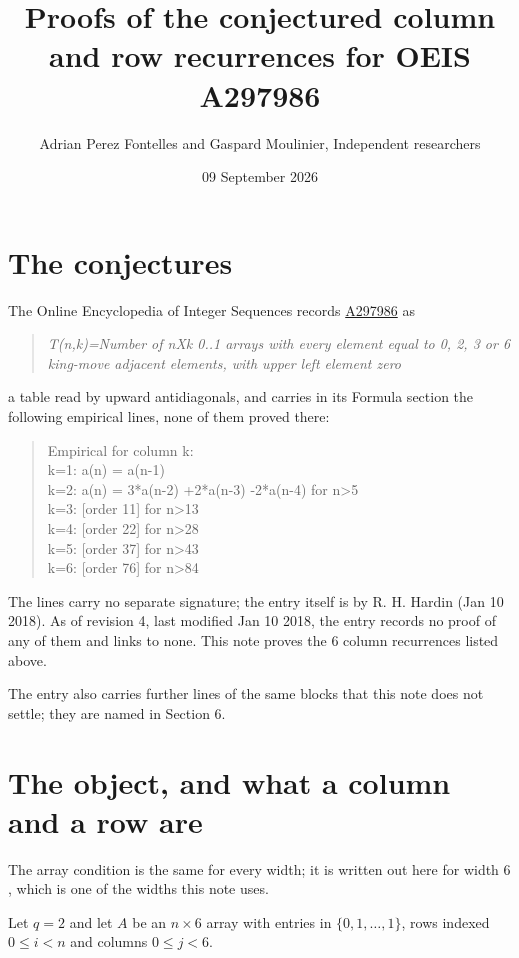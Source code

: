 \documentclass[11pt]{article}
\title{Proofs of the conjectured column and row recurrences for OEIS A297986}
\author{Adrian Perez Fontelles and Gaspard Moulinier, Independent researchers}
\date{09 September 2026}
\theoremstyle{definition}
\begin{document}
\maketitle
\section{The conjectures}

The Online Encyclopedia of Integer Sequences records \href{https://oeis.org/A297986}{A297986} as

\begin{quote}\itshape T(n,k)=Number of nXk 0..1 arrays with every element equal to 0, 2, 3 or 6 king-move adjacent elements, with upper left element zero\end{quote}

a table read by upward antidiagonals, and carries in its Formula section the following empirical lines, none of them proved there:

\begin{quote}\ttfamily Empirical for column k:\\
k=1: a(n) = a(n-1)\\k=2: a(n) = 3*a(n-2) +2*a(n-3) -2*a(n-4) for n>5\\k=3: [order 11] for n>13\\k=4: [order 22] for n>28\\k=5: [order 37] for n>43\\k=6: [order 76] for n>84\end{quote}

The lines carry no separate signature; the entry itself is by R. H. Hardin (Jan 10 2018). As of revision 4, last modified Jan 10 2018, the entry records no proof of any of them and links to none. This note proves the 6 column recurrences listed above.

The entry also carries further lines of the same blocks that this note does not settle; they are named in Section 6.

\section{The object, and what a column and a row are}

The array condition is the same for every width; it is written out here for width $6$, which is one of the widths this note uses.

Let $q = 2$ and let $A$ be an $n \times 6$ array with entries in $\{0,1,\dots,1\}$, rows indexed $0 \le i < n$ and columns $0 \le j < 6$.
\end{document}
